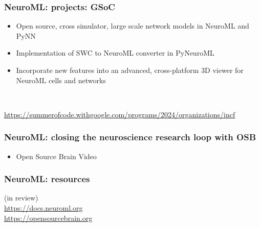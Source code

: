 \begin{frame}[c]
  \frametitle{NeuroML: projects: GSoC}
  \begin{itemize}
    \item Open source, cross simulator, large scale network models in NeuroML and PyNN
    \item Implementation of SWC to NeuroML converter in PyNeuroML
    \item Incorporate new features into an advanced, cross-platform 3D viewer for NeuroML cells and networks
  \end{itemize}\\\vspace{1cm}

  \begin{center}
    \url{https://summerofcode.withgoogle.com/programs/2024/organizations/incf}
  \end{center}
\end{frame}
\begin{frame}[c]
  \frametitle{NeuroML: closing the neuroscience research loop with OSB}
  \begin{itemize}
    \item Open Source Brain Video
  \end{itemize}
\end{frame}
\begin{frame}[c]
  \frametitle{NeuroML: resources}
  \begin{center}
    (in review)\\\vspace{1cm}
    \Large{\url{https://docs.neuroml.org}}\\
    \Large{\url{https://opensourcebrain.org}}
  \end{center}
\end{frame}

